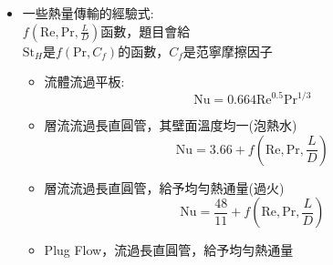 \documentclass[../main.tex]{subfiles}
\begin{document}
\begin{itemize}
\begin{itemize}
\begin{itemize}
\begin{align}
          &\quad + 2\pi kL (T_i - T_o) \frac{\left(\frac{1}{r_o} - \frac{k}{h r_o^2}\right) 
          \left(\frac{1}{r_o} - \frac{k}{h r_o^2}\right)}{\left[\ln\left(\frac{r_o}{r_i}\right) + \frac{k}{h r_o}\right]^3}
        \end{align}
        化簡後得到:
        \begin{equation}
          \frac{d^2}{dr_o^2}\left[q_{c,\text{after}} - q_{c,\text{before}}\right] =
          -2\pi kL (T_i - T_o) \frac{-\frac{1}{r_o^2} + \frac{2k}{h r_o^3}}{\left[\ln\left(\frac{r_o}{r_i}\right) + \frac{k}{h r_o}\right]^2}
        \end{equation}
        代入$r_o = \frac{k}{h}$:
        \begin{align}
          \frac{d^2}{dr_o^2}\left[q_{c,\text{after}} - q_{c,\text{before}}\right] &=
          -2\pi kL (T_i - T_o) \frac{-\frac{1}{\left(\frac{k}{h}\right)^2} + 
          \frac{2k}{h \left(\frac{k}{h}\right)^3}}{\left[\ln\left(\frac{\frac{k}{h}}{r_i}\right) + 1\right]^2} \nonumber\\
          &=-2\pi kL (T_i - T_o) \frac{\frac{1}{\left(\frac{k}{h}\right)^2}}{\left[\ln\left(\frac{\frac{k}{h}}{r_i}\right) + 1\right]^2} < 0
        \end{align}
        因此確定為最大值
      \end{itemize}
  \end{itemize}
  \item 一些熱量傳輸的經驗式:\\
    $f(\text{Re},\text{Pr},\frac{L}{D})$函數，題目會給\\
    $\text{St}_H$是$f(\text{Pr},C_f)$的函數，$C_f$是范寧摩擦因子
    \begin{itemize}
      \item 流體流過平板:
        \begin{equation}
          \text{Nu} = 0.664\text{Re}^{0.5}\text{Pr}^{1/3}
        \end{equation}
      \item 層流流過長直圓管，其壁面溫度均一(泡熱水)
        \begin{equation}
          \text{Nu} = 3.66 + f(\text{Re},\text{Pr},\frac{L}{D})
        \end{equation}
      \item 層流流過長直圓管，給予均勻熱通量(過火)
        \begin{equation}
          \text{Nu} = \frac{48}{11} + f(\text{Re},\text{Pr},\frac{L}{D})
        \end{equation}
      \item Plug Flow，流過長直圓管，給予均勻熱通量

\end{itemize}
\end{itemize}
\end{document}
